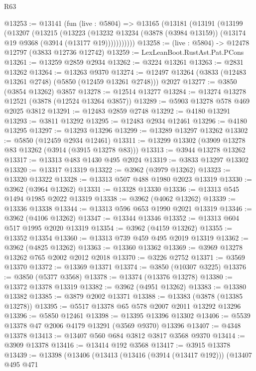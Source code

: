 \begin{lexlean}{R63}
\begin{coremodule}
@13253 := @13141
    (fun (live : @5804) =>
    @13165
      (@13181
        (@13191
          (@13199
            (@13207
              (@13215
                (@13223
                  (@13232
                    @13234
                    (@3878 (@3984 @13159))
                    (@13174 @19 @9368 (@3914 (@13177 @19)))))))))))
@13258 := (live : @5804) -> @12478 @12797 (@3833 @12736 @12742)
@13259 := LexLeanBoot.RustAst.Pat.PCons
@13261 := @13259 @2859 @2934
@13262 := @3224 @13261
@13263 := @2831 @13262
@13264 := @13263 @9370
@13274 := @12497 @13264 (@3833 (@12483 @13261 @2748) (@5850 (@12459 @13261 @2748))) @2027
@13277 := @3850 (@3854 @13262) @3857
@13278 := @12514 @13277
@13284 := @13274 @13278 @12521 (@3878 (@12524 @13264 @3857))
@13289 := @5903 @13278 @578 @469 @2025 @3812
@13291 := @12483 @2859 @2748
@13292 := @4180 @13291
@13293 := @3811 @13292
@13295 := @12483 @2934 @12461
@13296 := @4180 @13295
@13297 := @13293 @13296
@13299 := @13289 @13297 @13262
@13302 := @5850 (@12459 @2934 @12461)
@13311 := @13299 @13302 (@3909 @13278 @83 @13262 (@3914 (@3915 @13278 @83)))
@13313 := @3944 @13278 @13262
@13317 := @13313 @483 @1430 @495 @2024
@13319 := @3833 @13297 @13302
@13320 := @13317 @13319
@13322 := @3962 (@3979 @13262)
@13323 := @13320 @13322
@13328 := @13313 @507 @488 @1980 @2023 @13319
@13330 := @3962 (@3964 @13262)
@13331 := @13328 @13330
@13336 := @13313 @545 @1494 @1985 @2022 @13319
@13338 := @3962 (@4062 @13262)
@13339 := @13336 @13338
@13344 := @13313 @596 @653 @1990 @2021 @13319
@13346 := @3962 (@4106 @13262)
@13347 := @13344 @13346
@13352 := @13313 @604 @517 @1995 @2020 @13319
@13354 := @3962 (@4159 @13262)
@13355 := @13352 @13354
@13360 := @13313 @739 @459 @495 @2019 @13319
@13362 := @3962 (@4825 @13262)
@13363 := @13360 @13362
@13369 := @3969 @13278 @13262 @765 @2002 @2012 @2018
@13370 := @3226 @2752
@13371 := @3569 @13370
@13372 := @13369 @13371
@13374 := @3850 (@10307 @3225)
@13376 := @3850 (@5377 @3568)
@13378 := @13374 (@13376 @13278)
@13380 := @13372 @13378 @13319
@13382 := @3962 (@4951 @13262)
@13383 := @13380 @13382
@13385 := @3879 @2002 @13371
@13388 := @13383 (@3878 (@13385 @13278))
@13395 := @5517 @13378 @65 @578 @2007 @2011 @13292 @13296
@13396 := @5850 @12461
@13398 := @13395 @13396 @13302
@13406 := @5539 @13378 @47 @2006 @4179 @13291 (@3569 @9370) @13396
@13407 := @4348 @13378
@13413 := @13407 @560 @684 @3812 @3817 @3568 @9370
@13414 := @3909 @13378
@13416 := @13414 @192 @3568
@13417 := @3915 @13378
@13439 := @13398
    (@13406
      (@13413
        (@13416 (@3914 (@13417 @192)))
        (@13407
          @495
          @471

\end{coremodule}
\end{lexlean}
